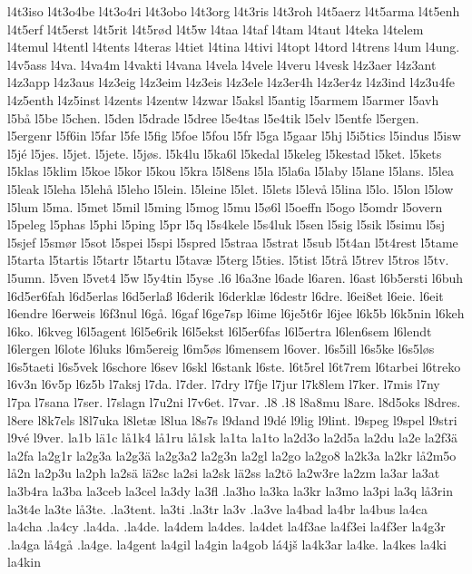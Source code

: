 {{l4t3iso
l4t3o4be
l4t3o4ri
l4t3obo
l4t3org
l4t3ris
l4t3roh
l4t5aerz
l4t5arma
l4t5enh
l4t5erf
l4t5erst
l4t5rit
l4t5rød
l4t5w
l4taa
l4taf
l4tam
l4taut
l4teka
l4telem
l4temul
l4tentl
l4tents
l4teras
l4tiet
l4tina
l4tivi
l4topt
l4tord
l4trens
l4um
l4ung.
l4v5ass
l4va.
l4va4m
l4vakti
l4vana
l4vela
l4vele
l4veru
l4vesk
l4z3aer
l4z3ant
l4z3app
l4z3aus
l4z3eig
l4z3eim
l4z3eis
l4z3ele
l4z3er4h
l4z3er4z
l4z3ind
l4z3u4fe
l4z5enth
l4z5inst
l4zents
l4zentw
l4zwar
l5aksl
l5antig
l5armem
l5armer
l5avh
l5bå
l5be
l5chen.
l5den
l5drade
l5dree
l5e4tas
l5e4tik
l5elv
l5entfe
l5ergen.
l5ergenr
l5f6in
l5far
l5fe
l5fig
l5foe
l5fou
l5fr
l5ga
l5gaar
l5hj
l5i5tics
l5indus
l5isw
l5jé
l5jes.
l5jet.
l5jete.
l5jøs.
l5k4lu
l5ka6l
l5kedal
l5keleg
l5kestad
l5ket.
l5kets
l5klas
l5klim
l5koe
l5kor
l5kou
l5kra
l5l8ens
l5la
l5la6a
l5laby
l5lane
l5lans.
l5lea
l5leak
l5leha
l5lehå
l5leho
l5lein.
l5leine
l5let.
l5lets
l5levå
l5lina
l5lo.
l5lon
l5low
l5lum
l5ma.
l5met
l5mil
l5ming
l5mog
l5mu
l5ø6l
l5oeffn
l5ogo
l5omdr
l5overn
l5peleg
l5phas
l5phi
l5ping
l5pr
l5q
l5s4kele
l5s4luk
l5sen
l5sig
l5sik
l5simu
l5sj
l5sjef
l5smør
l5sot
l5spei
l5spi
l5spred
l5straa
l5strat
l5sub
l5t4an
l5t4rest
l5tame
l5tarta
l5tartis
l5tartr
l5tartu
l5tavæ
l5terg
l5ties.
l5tist
l5trå
l5trev
l5tros
l5tv.
l5umn.
l5ven
l5vet4
l5w
l5y4tin
l5yse
.l6
l6a3ne
l6ade
l6aren.
l6ast
l6b5ersti
l6buh
l6d5er6fah
l6d5erlas
l6d5erlaß
l6derik
l6derklæ
l6destr
l6dre.
l6ei8et
l6eie.
l6eit
l6endre
l6erweis
l6f3nul
l6gå.
l6gaf
l6ge7sp
l6ime
l6je5t6r
l6jee
l6k5b
l6k5nin
l6keh
l6ko.
l6kveg
l6l5agent
l6l5e6rik
l6l5ekst
l6l5er6fas
l6l5ertra
l6len6sem
l6lendt
l6lergen
l6lote
l6luks
l6m5ereig
l6m5øs
l6mensem
l6over.
l6s5ill
l6s5ke
l6s5løs
l6s5taeti
l6s5vek
l6schore
l6sev
l6skl
l6stank
l6ste.
l6t5rel
l6t7rem
l6tarbei
l6treko
l6v3n
l6v5p
l6z5b
l7aksj
l7da.
l7der.
l7dry
l7fje
l7jur
l7k8lem
l7ker.
l7mis
l7ny
l7pa
l7sana
l7ser.
l7slagn
l7u2ni
l7v6et.
l7var.
.l8
.ł8
l8a8mu
l8are.
l8d5oks
l8dres.
l8ere
l8k7els
l8l7uka
l8letæ
l8lua
l8s7s
l9dand
l9dé
l9lig
l9lint.
l9speg
l9spel
l9stri
l9vé
l9ver.
la1b
lä1c
lå1k4
lå1ru
lå1sk
la1ta
la1to
la2d3o
la2d5a
la2du
la2e
la2f3ä
la2fa
la2g1r
la2g3a
la2g3ä
la2g3a2
la2g3n
la2gl
la2go
la2go8
la2k3a
la2kr
lå2m5o
lå2n
la2p3u
la2ph
la2sä
lä2sc
la2si
la2sk
lä2ss
la2tö
la2w3re
la2zm
la3ar
la3at
la3b4ra
la3ba
la3ceb
la3cel
la3dy
la3fl
.la3ho
la3ka
la3kr
la3mo
la3pi
la3q
lå3rin
la3t4e
la3te
lå3te.
.la3tent.
la3ti
.la3tr
la3v
.la3ve
la4bad
la4br
la4bus
la4ca
la4cha
.la4cy
.la4da.
.la4de.
la4dem
la4des.
la4det
la4f3ae
la4f3ei
la4f3er
la4g3r
.la4ga
lå4gå
.la4ge.
la4gent
la4gil
la4gin
la4gob
lá4jš
la4k3ar
la4ke.
la4kes
la4ki
la4kin
}}
